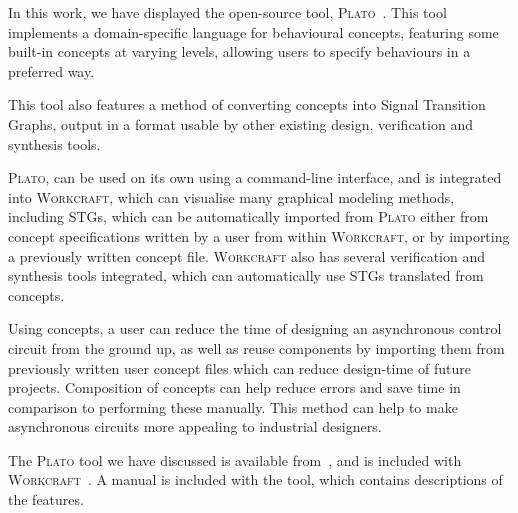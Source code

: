 \documentclass[british,conference,compsoc]{IEEEtran}
\newcommand{\noun}[1]{\textsc{#1}}
\begin{document}
\vspace{-3mm}

In this work, we have displayed the open-source
tool, \noun{Plato}~\cite{2016_concepts_github}. This tool implements a 
domain-specific language for behavioural concepts, featuring some built-in 
concepts at varying levels, allowing users to specify behaviours in a preferred 
way. 

This tool also features a method of converting concepts into Signal
Transition Graphs, output in a format usable by other existing design, 
verification and synthesis tools. 

\noun{Plato}, can be used on its own using a command-line interface, and is
integrated into \noun{Workcraft}, which can visualise many graphical modeling
methods, including STGs, which can be automatically imported from \noun{Plato}
either from concept specifications written by a user from within 
\noun{Workcraft}, or by importing a previously written concept file.
\noun{Workcraft} also has several verification and synthesis tools 
integrated, which can automatically use STGs translated from concepts. 

Using concepts, a user can reduce the time of designing an asynchronous
control circuit from the ground up, as well as reuse components
by importing them from previously written user concept files which can reduce 
design-time of future projects. Composition of concepts can help
reduce errors and save time in comparison to performing these manually.
This method can help to make asynchronous circuits more appealing
to industrial designers.


The \noun{Plato} tool we have discussed is available 
from~\cite{2016_concepts_github}, and is included with 
\noun{Workcraft}~\cite{Workcraft_website}. A manual is included with the tool, 
which contains descriptions of the features. 

\vspace{-2.5mm}



\end{document}
